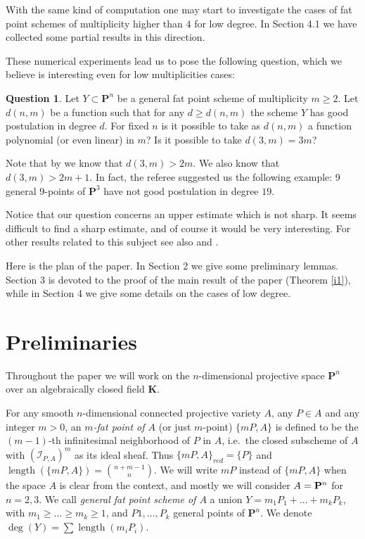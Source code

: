 \documentclass{amsart}
\theoremstyle{plain}
\theoremstyle{definition}
\newtheorem{question}[theorem]{Question}
\begin{document}
With the same kind of computation one may start to investigate the cases of fat
point schemes of multiplicity higher than $4$ for low degree. In
Section 4.1 we have collected some partial results in this direction.

These numerical experiments lead us to pose the following question,
which we believe is interesting even for low multiplicities cases:
\begin{question}
Let $Y \subset {\mathbf P}^n$ be a general
fat point scheme of multiplicity $m\ge2$.
Let $d(n,m)$ be a function such that for any $d\ge d(n,m)$ the scheme
$Y$ has good postulation in degree $d$.
For fixed $n$ is it possible to take as $d(n,m)$ a function polynomial
(or even linear) in $m$?
Is it possible to take $d(3,m)=3m$?
\end{question}

Note that by \cite[Example 7.7]{laface-ugaglia} we know that
$d(3,m)>2m$. We also know that $d(3,m)>2m+1$.
In fact, the referee suggested us the following example:
$9$ general $9$-points of ${\mathbf P}^3$ have not good postulation in degree $19$.

Notice that our question concerns an upper estimate which is not sharp.
It seems difficult to find a sharp estimate, and of course it would be very interesting.
For other results related to this subject see also \cite{volder-laface}
and \cite{dumnicki}.

\medskip

Here is the plan of the paper.
In Section 2 we give some preliminary lemmas.
Section 3 is devoted to the proof of the main result of the paper
(Theorem \ref{i1}), while in Section 4 we give some details on the
cases of low degree.

\section{Preliminaries}
Throughout the paper we will work on the $n$-dimensional projective
space ${\mathbf P}^n$ over an algebraically closed field $\mathbf{K}$.

For any smooth $n$-dimensional connected projective variety $A$,
any $P\in A$ and any integer $m>0$, an {\em $m$-fat point of $A$} (or just
$m$-point) $\{mP,A\}$ is defined to be the $(m-1)$-th
infinitesimal neighborhood of $P$ in $A$, i.e.\ the closed subscheme
of $A$ with $(\mathcal {I}_{P,A})^m$ as its ideal sheaf.
Thus $\{mP,A\}_{red} = \{P\}$ and $\operatorname{length}(\{mP,A\})= \binom{n+m-1}{n}$.
We will write $mP$ instead of $\{mP,A\}$ when the space $A$ is clear
from the context, and mostly we will consider $A={\bf {P}}^n$ for $n=2,3$.
We call {\em general fat point scheme of $A$} a union $Y=m_1P_1+\ldots+m_kP_k$, with
$m_1\ge\ldots\ge m_k\ge1$, and $P1,\ldots,P_k$ general points of
${\mathbf P}^n$. We denote $\deg(Y)=\sum \operatorname{length}(m_iP_i)$.
\end{document}
